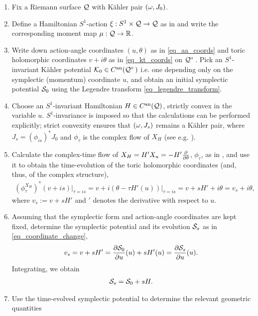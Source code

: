 \documentclass[notas.tex]{subfiles}
\begin{document}
\begin{enumerate}
	\item Fix a Riemann surface $\mathcal{Q}$ with Kähler pair $( \omega, J_0)$.
	\item Define a Hamiltonian $S^1$-action $\xi: S^1 \times \mathcal{Q} \to \mathcal{Q}$ as in  and write the corresponding moment map $\mu: \mathcal{Q} \to \mathbb{R}$.
	\item Write down action-angle coordinates $(u, \theta)$ as in \eqref{eq_aa_coords} and toric holomorphic coordinates $v+i\theta$ as in \eqref{eq_kt_coords} on $\nfld^\circ$. Pick an $S^1$-invariant Kähler potential $\kpot_0 \in C^\ra(\nfld^\circ)$ i.e. one depending only on the symplectic (momentum) coordinate $u$, and obtain an initial symplectic potential $\mathcal{S}_0$ using the Legendre transform \eqref{eq_legendre_transform}.
	\item Choose an $S^1$-invariant Hamiltonian $H \in C^{\text{an}}(\mathcal{Q})$, strictly convex in the variable $u$. $S^1$-invariance is imposed so that the calculations can be performed explicitly; strict convexity ensures that $(\omega, J_s)$ remains a Kähler pair, where $J_s = (\phi_{is})^* J_0$ and $\phi_{\tau}$ is the complex flow of $X_H$ (see e.g. \cite[Section 2.3]{baier_toric_2011}).
	\item Calculate the complex-time flow of $X_H = H' X_u = - H' \frac{\partial }{\partial \theta}$, $\phi_\tau$, as in , and use it to obtain the time-evolution of the toric holomorphic coordinates (and, thus, of the complex structure),
	\begin{align} \label{eq_cylinder_ktoric_evolution}
		\left ( \phi_\tau^{X_H} \right )^* (v+is) \big|_{\tau=is} = v + i(\theta - \tau H'(u)) \big|_{\tau=is} = v + sH' + i \theta = v_{s} + i \theta,
	\end{align}
	where $v_{s} := v + sH'$ and $'$ denotes the derivative with respect to $u$.
	\item \label{intro_symplectic_evolution} Assuming that the symplectic form and action-angle coordinates are kept fixed, determine the symplectic potential and its evolution $\mathcal{S}_s$ as in \eqref{eq_coordinate_change},
	\begin{align*}
		v_{s} = v + sH' = \frac{\partial \mathcal{S}_0}{\partial u}(u) + sH'(u) = \frac{\partial \mathcal{S}_{s}}{\partial u}(u).
	\end{align*}
	Integrating, we obtain
	\begin{align*}
		\mathcal{S}_{s} = \mathcal{S}_0 + sH.
	\end{align*}
	\item Use the time-evolved symplectic potential to determine the relevant geometric quantities

\end{enumerate}
\end{document}
